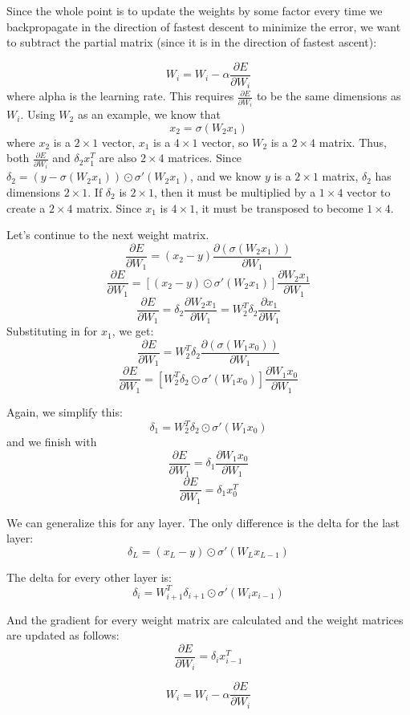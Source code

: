 \documentclass{article}
\begin{document}
Since the whole point is to update the weights by some factor every time we backpropagate in the direction of fastest descent to minimize the error, we want to subtract the partial matrix (since it is in the direction of fastest ascent):

\[W_i =  W_i - \alpha \frac{\partial E}{\partial W_i}\]
where alpha is the learning rate. This requires $\frac{\partial E}{\partial W_i}$ to be the same dimensions as $W_i$. Using $W_2$ as an example, we know that
\[x_2 = \sigma(W_2x_1)\]
where $x_2$ is a $2 \times 1$ vector, $x_1$ is a $4 \times 1$ vector, so $W_2$ is a $2 \times 4$ matrix. Thus, both $\frac{\partial E}{\partial W_i}$ and $\delta_2 x_1^T$ are also $2 \times 4$ matrices. Since $\delta_2 = (y - \sigma(W_2x_1)) \odot \sigma'(W_2x_1)$, and we know $y$ is a $2 \times 1$ matrix, $\delta_2$ has dimensions $2 \times 1$. If $\delta_2$ is $2 \times 1$, then it must be multiplied by a $1 \times 4$ vector to create a $2 \times 4$ matrix. Since $x_1$ is $4 \times 1$, it must be transposed to become $1 \times 4$.

Let's continue to the next weight matrix.
\[\frac{\partial E}{\partial W_1} = (x_2 - y) \frac{\partial (\sigma(W_2x_1))}{\partial W_1}\]
\[\frac{\partial E}{\partial W_1} = [(x_2-y) \odot \sigma'(W_2x_1)] \frac{\partial W_2x_1}{\partial W_1}\]
\[\frac{\partial E}{\partial W_1} = \delta_2 \frac{\partial W_2x_1}{\partial W_1} = W_2^T\delta_2 \frac{\partial x_1}{\partial W_1}\]
Substituting in for $x_1$, we get:
\[\frac{\partial E}{\partial W_1} = W_2^T\delta_2 \frac{\partial (\sigma(W_1x_0))}{\partial W_1}\]
\[\frac{\partial E}{\partial W_1} = [W_2^T\delta_2 \odot \sigma'(W_1x_0)]\frac{\partial W_1x_0}{\partial W_1}\]

Again, we simplify this:
\[\delta_1 = W_2^T\delta_2 \odot \sigma'(W_1x_0)\]
and we finish with
\[\frac{\partial E}{\partial W_1} = \delta_1 \frac{\partial W_1x_0}{\partial W_1}\]
\[\frac{\partial E}{\partial W_1} = \delta_1 x_0^T\]

We can generalize this for any layer. The only difference is the delta for the last layer:
\[\delta_L = (x_L - y) \odot \sigma'(W_{L}x_{L-1})\] 

The delta for every other layer is:
\[\delta_i = W_{i+1}^T\delta_{i+1} \odot \sigma'(W_ix_{i-1})\]

And the gradient for every weight matrix are calculated and the weight matrices are updated as follows:
\[\frac{\partial E}{\partial W_i} = \delta_i x_{i-1}^T\]

\[W_i =  W_i - \alpha \frac{\partial E}{\partial W_i}\]
\end{document}
